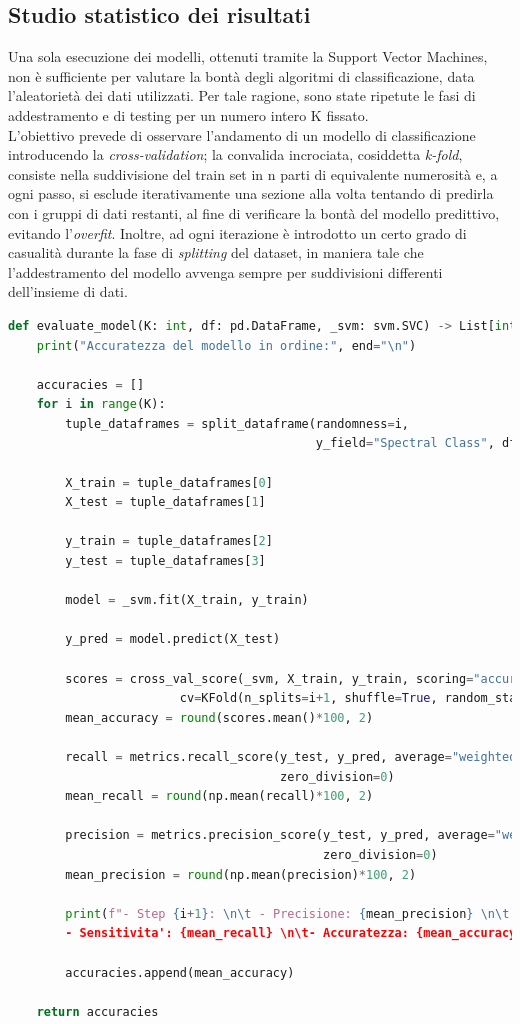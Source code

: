 \documentclass{article}
\begin{document}
    \subsection*{Studio statistico dei risultati}
    Una sola esecuzione dei modelli, ottenuti tramite la Support Vector Machines, non è sufficiente per valutare la bontà degli algoritmi di classificazione, data l'aleatorietà dei dati utilizzati. Per tale ragione, sono state ripetute le fasi di addestramento e di testing per un numero intero K fissato. \vspace{7pt}\\
    L'obiettivo prevede di osservare l'andamento di un modello di classificazione introducendo la \textit{cross-validation}; la convalida incrociata, cosiddetta \textit{k-fold}, consiste nella suddivisione del train set in n parti di equivalente numerosità e, a ogni passo, si esclude iterativamente una sezione alla volta tentando di predirla con i gruppi di dati restanti, al fine di verificare la bontà del modello predittivo, evitando l'\textit{overfit}. Inoltre, ad ogni iterazione è introdotto un certo grado di casualità durante la fase di \textit{splitting} del dataset, in maniera tale che l'addestramento del modello avvenga sempre per suddivisioni differenti dell'insieme di dati.
    \begin{lstlisting}[language=Python]
def evaluate_model(K: int, df: pd.DataFrame, _svm: svm.SVC) -> List[int]:
    print("Accuratezza del modello in ordine:", end="\n")

    accuracies = []
    for i in range(K):
        tuple_dataframes = split_dataframe(randomness=i, 
                                           y_field="Spectral Class", df=df)

        X_train = tuple_dataframes[0]
        X_test = tuple_dataframes[1]

        y_train = tuple_dataframes[2]
        y_test = tuple_dataframes[3]

        model = _svm.fit(X_train, y_train)

        y_pred = model.predict(X_test)

        scores = cross_val_score(_svm, X_train, y_train, scoring="accuracy", 
                        cv=KFold(n_splits=i+1, shuffle=True, random_state=20+2*i))
        mean_accuracy = round(scores.mean()*100, 2) 

        recall = metrics.recall_score(y_test, y_pred, average="weighted",
                                      zero_division=0)
        mean_recall = round(np.mean(recall)*100, 2)
        
        precision = metrics.precision_score(y_test, y_pred, average="weighted", 
                                            zero_division=0)
        mean_precision = round(np.mean(precision)*100, 2)

        print(f"- Step {i+1}: \n\t - Precisione: {mean_precision} \n\t
        - Sensitivita': {mean_recall} \n\t- Accuratezza: {mean_accuracy}", end="\n")
        
        accuracies.append(mean_accuracy)

    return accuracies
    \end{lstlisting}
\end{document}
